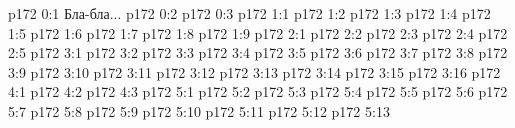 \author{Промежуточные создания}
\vs p172 0:1  Бла-бла...
\vs p172 0:2 
\vs p172 0:3 
\vs p172 1:1 
\vs p172 1:2 
\vs p172 1:3 
\vs p172 1:4 
\vs p172 1:5 \pc 
\vs p172 1:6 
\vs p172 1:7 
\vs p172 1:8 
\vs p172 1:9 
\vs p172 2:1 
\vs p172 2:2 
\vs p172 2:3 
\vs p172 2:4 
\vs p172 2:5 
\vs p172 3:1 
\vs p172 3:2 
\vs p172 3:3 
\vs p172 3:4 
\vs p172 3:5 \pc 
\vs p172 3:6 \pc 
\vs p172 3:7 
\vs p172 3:8 
\vs p172 3:9 
\vs p172 3:10 
\vs p172 3:11 
\vs p172 3:12 
\vs p172 3:13 
\vs p172 3:14 
\vs p172 3:15 
\vs p172 3:16 
\vs p172 4:1 
\vs p172 4:2 
\vs p172 4:3 
\vs p172 5:1 
\vs p172 5:2 
\vs p172 5:3 
\vs p172 5:4 
\vs p172 5:5 
\vs p172 5:6 \pc 
\vs p172 5:7 \pc 
\vs p172 5:8 \pc 
\vs p172 5:9 \pc 
\vs p172 5:10 
\vs p172 5:11 
\vs p172 5:12 
\vs p172 5:13 
\quizlink
